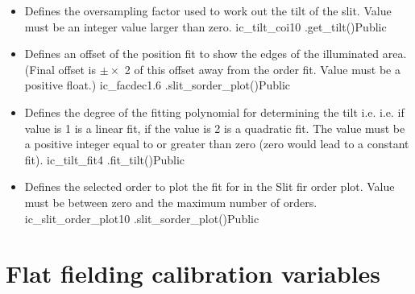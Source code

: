 \begin{itemize}

\item {}
{Defines the oversampling factor used to work out the tilt of the slit. Value must be an integer value larger than zero.}
{ic\_tilt\_coi}{10}
{\calSLIT}{\constantsfile}{\spirouImage.get\_tilt()}{Public}


\item {}
{Defines an offset of the position fit to show the edges of the illuminated area. (Final offset is $\pm \times$ 2 of this offset away from the order fit. Value must be a positive float.)}
{ic\_facdec}{1.6}
{\calSLIT}{\constantsfile}{\spirouPlot.slit\_sorder\_plot()}{Public}


\item {}
{Defines the degree of the fitting polynomial for determining the tilt i.e. i.e. if value is 1 is a linear fit, if the value is 2 is a quadratic fit.  The value must be a positive integer equal to or greater than zero (zero would lead to a constant fit).}
{ic\_tilt\_fit}{4}
{\calSLIT}{\constantsfile}{\spirouImage.fit\_tilt()}{Public}


\item {}
{Defines the selected order to plot the fit for in the Slit fir order plot. Value must be between zero and the maximum number of orders.}
{ic\_slit\_order\_plot}{10}
{\calSLIT}{\constantsfile}{\spirouPlot.slit\_sorder\_plot()}{Public}


\end{itemize}






\clearpage
\newpage
\section{Flat fielding calibration variables}
\label{ch:variables:flatfielding}

